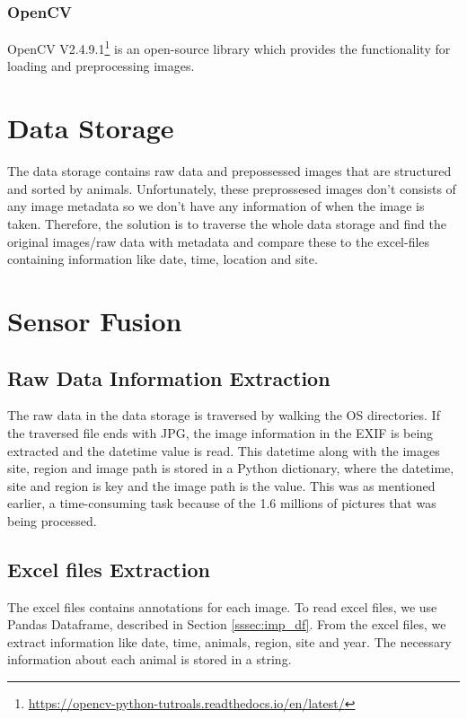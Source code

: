 \documentclass[USenglish]{uit-thesis}
\begin{document}
\subsubsection{OpenCV} \label{sssec:imp_cv}
OpenCV V2.4.9.1\footnote{\url{https://opencv-python-tutroals.readthedocs.io/en/latest/}} is an open-source library which provides the functionality for loading and preprocessing images.


\section{Data Storage} \label{sec:imp_storage}
The data storage contains raw data and prepossessed images that are structured and sorted by animals. Unfortunately, these preprossesed images don't consists of any image metadata so we don't have any information of when the image is taken. Therefore, the solution is to traverse the whole data storage and find the original images/raw data with metadata and compare these to the excel-files containing information like date, time, location and site.


\section{Sensor Fusion} \label{sec:imp_senfus}
\subsection{Raw Data Information Extraction}
The raw data in the data storage is traversed by walking the OS directories. If the traversed file ends with JPG, the image information in the EXIF is being extracted and the datetime value is read. This datetime along with the images site, region and image path is stored in a Python dictionary, where the datetime, site and region is key and the image path is the value. This was as mentioned earlier, a time-consuming task because of the 1.6 millions of pictures that was being processed.

\subsection{Excel files Extraction}
The excel files contains annotations for each image. To read excel files, we use Pandas Dataframe, described in Section \ref{sssec:imp_df}. From the excel files, we extract information like date, time, animals, region, site and year. The necessary information about each animal is stored in a string.
\end{document}
